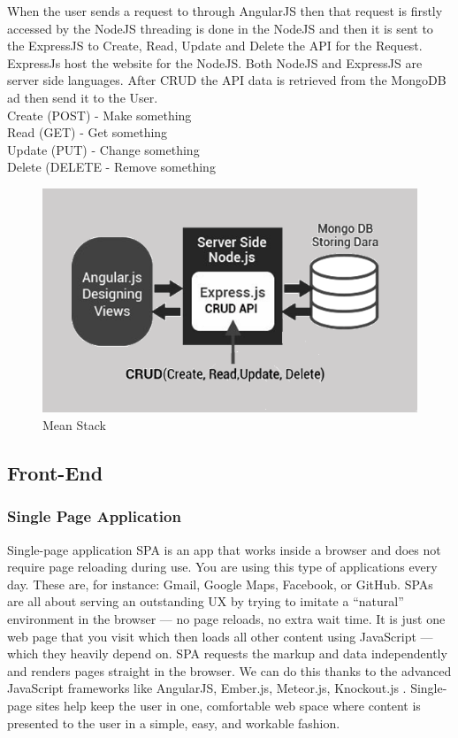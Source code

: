 When the user sends a request to through AngularJS then that request is firstly accessed by the NodeJS threading is done in the NodeJS and then it is sent to the ExpressJS to Create, Read, Update and Delete the API for the Request. ExpressJs host the website for the NodeJS. Both NodeJS and ExpressJS are server side languages. After \ac{CRUD} the \ac{API} data is retrieved from the MongoDB ad then send it to the User.
\\
Create (POST) - Make something\\
Read (GET) - Get something\\
Update (PUT) - Change something\\
Delete (DELETE - Remove something\\

\begin{figure}[!ht]
      \center
      \includegraphics[scale=0.60]{assets/meanarchdesc.png}
      \caption{Mean Stack}
      \label{fig:mean}
\end{figure}

\subsection{Front-End}
\subsubsection{Single Page Application}
Single-page application \ac{SPA} is an app that works inside a browser and does not require page reloading during use. You are using this type of applications every day. These are, for instance: Gmail, Google Maps, Facebook, or GitHub.
SPAs are all about serving an outstanding UX by trying to imitate a “natural” environment in the browser — no page reloads, no extra wait time. It is just one web page that you visit which then loads all other content using JavaScript — which they heavily depend on.
SPA requests the markup and data independently and renders pages straight in the browser. We can do this thanks to the advanced JavaScript frameworks like AngularJS, Ember.js, Meteor.js, Knockout.js .
Single-page sites help keep the user in one, comfortable web space where content is presented to the user in a simple, easy, and workable fashion.

